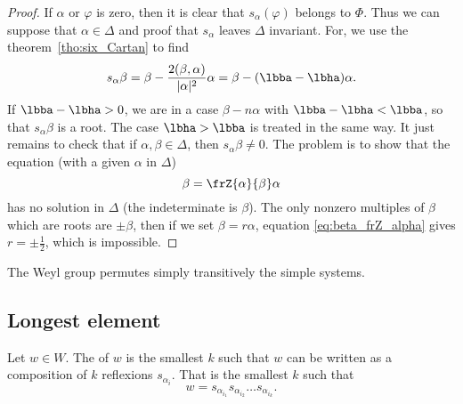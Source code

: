 \begin{proof}
If $\alpha$ or $\varphi$ is zero, then it is clear that $s_{\alpha}(\varphi)$ belongs to $\Phi$. Thus we can suppose that $\alpha\in\Delta$ and proof that $s_{\alpha}$ leaves $\Delta$ invariant. For, we use the theorem~\ref{tho:six_Cartan} to find
\begin{equation}
  s_{\alpha}\beta=\beta-\frac{2(\beta,\alpha)}{|\alpha|^2}\alpha
               =\beta-(\lbba-\lbha)\alpha.
\end{equation}
If $\lbba-\lbha>0$, we are in a case $\beta-n\alpha$ with $\lbba-\lbha<\lbba$, so that $s_{\alpha}\beta$ is a root. The case $\lbha>\lbba$ is treated in the same way. It just remains to check that  if $\alpha,\beta\in\Delta$, then $s_{\alpha}\beta\neq0$. The problem is to show that the equation (with a given $\alpha$ in $\Delta$)
\begin{equation}\label{eq:beta_frZ_alpha}
   \beta=\frZ{\alpha}{\beta}\alpha
\end{equation}
has no solution in $\Delta$ (the indeterminate is $\beta$). The only nonzero multiples of $\beta$ which are roots are $\pm\beta$, then if we set $\beta=r\alpha$, equation \eqref{eq:beta_frZ_alpha} gives $r=\pm\frac{1}{2}$, which is impossible.

\end{proof}

\begin{proposition}
    The Weyl group permutes simply transitively the simple systems.
\end{proposition}



\subsection{Longest element}

Let \( w\in W\). The  of \( w\) is the smallest \( k\) such that \( w\) can be written as a composition of \( k\) reflexions \( s_{\alpha_i}\). That is the smallest \( k\) such that
\begin{equation}
    w=s_{\alpha_{i_1}}s_{\alpha_{i_2}}\ldots s_{\alpha_{i_k}}.
\end{equation}

